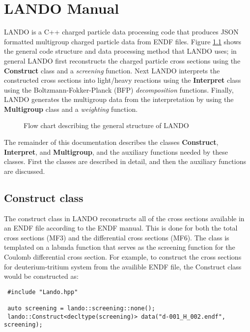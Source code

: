 \documentclass[../main.tex]{subfiles}
\begin{document}
\chapter{LANDO Manual}
LANDO is a C++ charged particle data processing code that produces JSON formatted multigroup charged particle data from ENDF files. Figure \ref{fig:LANDO_code_structure} shows the general code structure and data processing method that LANDO uses; in general LANDO first reconstructs the charged particle cross sections using the \textbf{Construct} class and a \textit{screening} function. Next LANDO interprets the constructed cross sections into light/heavy reactions using the \textbf{Interpret} class using the Boltzmann-Fokker-Planck (BFP) \textit{decomposition} functions. Finally, LANDO generates the multigroup data from the interpretation by using the \textbf{Multigroup} class and a \textit{weighting} function.

\begin{figure}[!htb]
\centering
{}
\caption{Flow chart describing the general structure of LANDO}
\label{fig:LANDO_code_structure}
\end{figure}

The remainder of this documentation describes the classes \textbf{Construct}, \textbf{Interpret}, and \textbf{Multigroup}, and the auxiliary functions needed by these classes. First the classes are described in detail, and then the auxiliary functions are discussed.

\section{Construct class}
The construct class in LANDO reconstructs all of the cross sections available in an ENDF file according to the ENDF manual. This is done for both the total cross sections (MF3) and the differential cross sections (MF6). The class is templated on a labmda function that serves as the screening function for the Coulomb differential cross section. For example, to construct the cross sections for deuterium-tritium system from the availible ENDF file, the Construct class would be constructed as:

\begin{verbatim}
 #include "Lando.hpp"

 auto screening = lando::screening::none();
 lando::Construct<decltype(screening)> data("d-001_H_002.endf", screening);
\end{verbatim}
\end{document}
